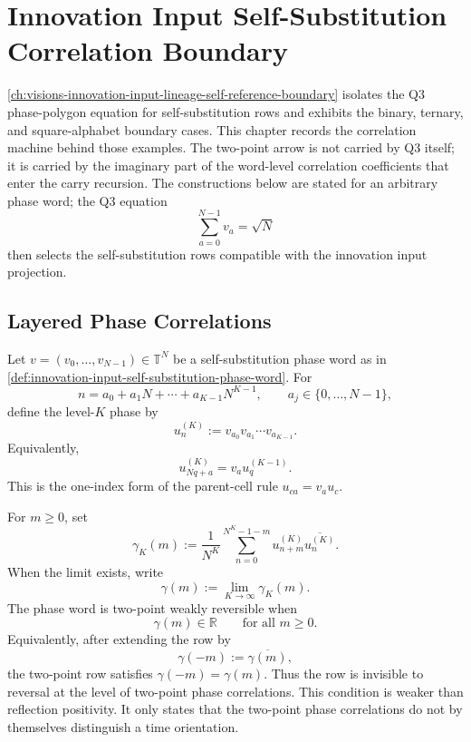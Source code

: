 \chapter{Innovation Input Self-Substitution Correlation Boundary}
\label{ch:visions-innovation-input-self-substitution-correlation-boundary}

\autoref{ch:visions-innovation-input-lineage-self-reference-boundary}
isolates the Q3 phase-polygon equation for self-substitution rows and
exhibits the binary, ternary, and square-alphabet boundary cases. This
chapter records the correlation machine behind those examples. The
two-point arrow is not carried by Q3 itself; it is carried by the imaginary
part of the word-level correlation coefficients that enter the carry
recursion. The constructions below are stated for an arbitrary phase word;
the Q3 equation
$$
\sum_{a=0}^{N-1}v_a=\sqrt N
$$
then selects the self-substitution rows compatible with the innovation
input projection.

\section{Layered Phase Correlations}
\label{sec:innovation-input-correlation-layered-phases}

\begin{definition}
\label{def:innovation-input-layered-phase-sequence}
Let $v=(v_0,\ldots,v_{N-1})\in\mathbb T^N$ be a self-substitution phase
word as in
\autoref{def:innovation-input-self-substitution-phase-word}. For
$$
n=a_0+a_1N+\cdots+a_{K-1}N^{K-1},
\qquad
a_j\in\{0,\ldots,N-1\},
$$
define the level-$K$ phase by
$$
u_n^{(K)}
:=
v_{a_0}v_{a_1}\cdots v_{a_{K-1}}.
$$
Equivalently,
$$
u_{Nq+a}^{(K)}=v_a u_q^{(K-1)}.
$$
This is the one-index form of the parent-cell rule $u_{ca}=v_a u_c$.
\end{definition}

\begin{definition}
\label{def:innovation-input-two-point-weak-reversibility}
For $m\ge0$, set
$$
\gamma_K(m)
:=
\frac1{N^K}
\sum_{n=0}^{N^K-1-m}
u_{n+m}^{(K)}\overline{u_n^{(K)}}.
$$
When the limit exists, write
$$
\gamma(m):=\lim_{K\to\infty}\gamma_K(m).
$$
The phase word is two-point weakly reversible when
$$
\gamma(m)\in\mathbb R
\qquad
\text{for all }m\ge0.
$$
Equivalently, after extending the row by
$$
\gamma(-m):=\overline{\gamma(m)},
$$
the two-point row satisfies $\gamma(-m)=\gamma(m)$. Thus the row is
invisible to reversal at the level of two-point phase correlations.
This condition is weaker than reflection positivity. It only states that
the two-point phase correlations do not by themselves distinguish a time
orientation.
\end{definition}

